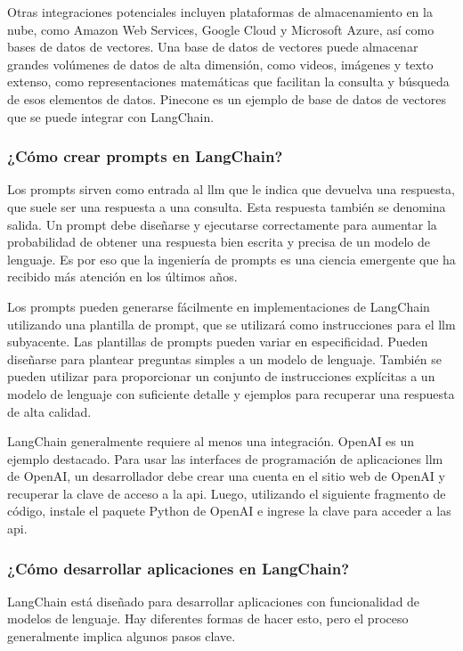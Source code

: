 Otras integraciones potenciales incluyen plataformas de almacenamiento en la nube, como Amazon Web Services, Google Cloud y Microsoft Azure, así como bases de datos de vectores. Una base de datos de vectores puede almacenar grandes volúmenes de datos de alta dimensión, como videos, imágenes y texto extenso, como representaciones matemáticas que facilitan la consulta y búsqueda de esos elementos de datos. Pinecone es un ejemplo de base de datos de vectores que se puede integrar con LangChain.

\subsubsection{¿Cómo crear prompts en LangChain?}
Los prompts sirven como entrada al \acrshort{llm} que le indica que devuelva una respuesta, que suele ser una respuesta a una consulta. Esta respuesta también se denomina salida. Un prompt debe diseñarse y ejecutarse correctamente para aumentar la probabilidad de obtener una respuesta bien escrita y precisa de un modelo de lenguaje. Es por eso que la ingeniería de prompts es una ciencia emergente que ha recibido más atención en los últimos años.

Los prompts pueden generarse fácilmente en implementaciones de LangChain utilizando una plantilla de prompt, que se utilizará como instrucciones para el \acrshort{llm} subyacente. Las plantillas de prompts pueden variar en especificidad. Pueden diseñarse para plantear preguntas simples a un modelo de lenguaje. También se pueden utilizar para proporcionar un conjunto de instrucciones explícitas a un modelo de lenguaje con suficiente detalle y ejemplos para recuperar una respuesta de alta calidad.

LangChain generalmente requiere al menos una integración. OpenAI es un ejemplo destacado. Para usar las interfaces de programación de aplicaciones \acrshort{llm} de OpenAI, un desarrollador debe crear una cuenta en el sitio web de OpenAI y recuperar la clave de acceso a la \acrshort{api}. Luego, utilizando el siguiente fragmento de código, instale el paquete Python de OpenAI e ingrese la clave para acceder a las \acrshort{api}.

\subsubsection{¿Cómo desarrollar aplicaciones en LangChain?}
LangChain está diseñado para desarrollar aplicaciones con funcionalidad de modelos de lenguaje. Hay diferentes formas de hacer esto, pero el proceso generalmente implica algunos pasos clave.

